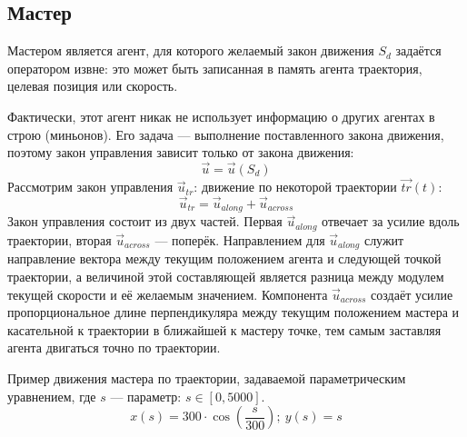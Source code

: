 \documentclass[a4paper, 14pt]{extarticle}
\let\Oldsubsection\subsection
\renewcommand{\subsection}{\FloatBarrier\Oldsubsection}
\begin{document}
\subsection{Мастер}
Мастером является агент, для которого желаемый закон движения $S_d$ задаётся оператором извне: это может быть записанная в память агента траектория, целевая позиция или скорость. \par
Фактически, этот агент никак не использует информацию о других агентах в строю (миньонов). Его задача — выполнение поставленного закона движения, поэтому закон управления зависит только от закона движения:
$$ \vec{u} = \vec{u}(S_d)$$
Рассмотрим закон управления $\vec{u}_{tr}$: движение по некоторой траектории $\vec{tr}(t)$:
$$ \vec{u}_{tr} = \vec{u}_{along} + \vec{u}_{across} $$
Закон управления состоит из двух частей. Первая $\vec{u}_{along}$ отвечает за усилие вдоль траектории, вторая $\vec{u}_{across}$ — поперёк. Направлением для $\vec{u}_{along}$ служит направление вектора между текущим положением агента и следующей точкой траектории, а величиной этой составляющей является разница между модулем текущей скорости и её желаемым значением.  Компонента $\vec{u}_{across}$ создаёт усилие пропорциональное длине перпендикуляра между текущим положением мастера и касательной к траектории в ближайшей к мастеру точке, тем самым заставляя агента двигаться точно по траектории. \par
\bigskip
Пример движения мастера по траектории, задаваемой параметрическим уравнением, где $s$ — параметр: $s \in [0, 5000]$.
$$x(s) = 300 \cdot \cos(\frac{s}{300}); \ y(s) = s$$
\end{document}
